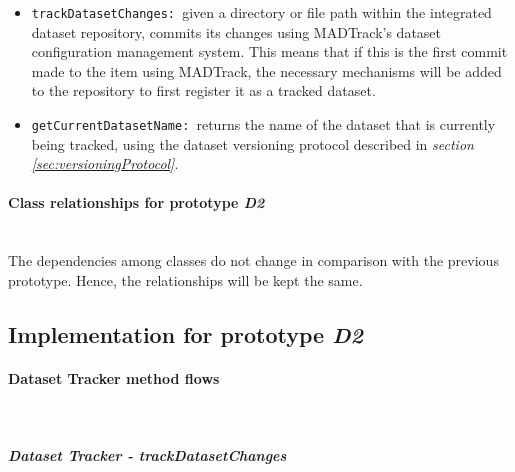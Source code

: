\begin{itemize}
    \item \texttt{trackDatasetChanges: }given a directory or file path within the integrated dataset repository, commits its changes using MADTrack's dataset 
    configuration management system. This means that if this is the first commit made to the item using MADTrack, the necessary mechanisms will be added to the 
    repository to first register it as a tracked dataset.

    \item \texttt{getCurrentDatasetName: }returns the name of the dataset that is currently being tracked, using the dataset versioning protocol described in \emph{section \ref{sec:versioningProtocol}}.
\end{itemize}

\paragraph{Class relationships for prototype \emph{D2}} \mbox{}\\

The dependencies among classes do not change in comparison with the previous prototype. Hence, the relationships will be kept the same.

\subsection{Implementation for prototype \emph{D2}}

\paragraph{Dataset Tracker method flows} \mbox{}\\

\subparagraph{Dataset Tracker - trackDatasetChanges} \mbox{}\\

